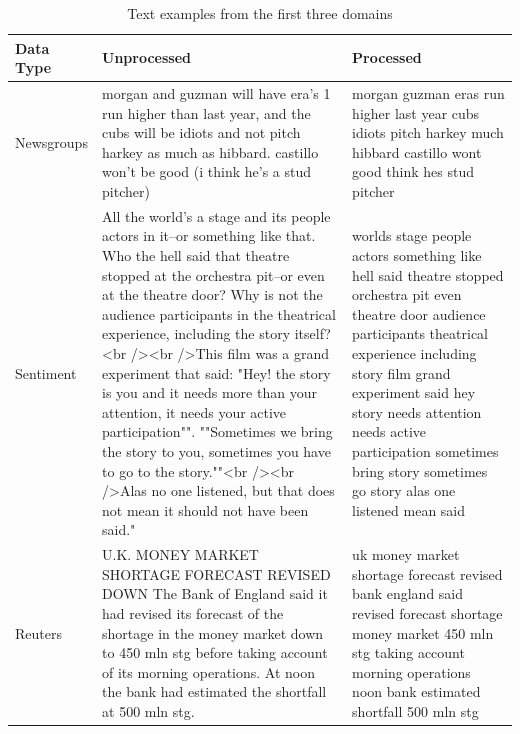 \begin{table}[] 
	\scriptsize
	\begin{tabular}{lp{6.75cm}p{6.75cm}}
		Data Type  & Unprocessed                                                                                                                                                                                                                                                                                                                                                                               & Processed       \\
		\midrule[\heavyrulewidth]
		Newsgroups & morgan and guzman will have era's 1 run higher than last year, and  the cubs will be idiots and not pitch harkey as much as hibbard.  castillo won't be good (i think he's a stud pitcher)                                                                                                                                                                                                & morgan guzman eras run higher last year cubs idiots pitch harkey much hibbard castillo wont good think hes stud pitcher                            \\
		Sentiment  & All the world's a stage and its people actors in it--or something like that. Who the hell said that theatre stopped at the orchestra pit--or even at the theatre door? 
		Why is not the audience participants in the theatrical experience, including the story itself?<br /><br />This film was a grand experiment that said: "Hey! the story is you and it 
		needs more than your attention, it needs your active participation"". ""Sometimes we bring the story to you, sometimes you have to go to the story.""<br /><br />Alas no one listened, 
		but that does not mean it should not have been said." & worlds stage people actors something like hell said theatre stopped orchestra pit even theatre door audience participants
		theatrical experience including  story film grand experiment said hey story needs attention needs active participation sometimes bring story sometimes go story alas one listened mean
		said \\
		Reuters    & U.K. MONEY MARKET SHORTAGE FORECAST REVISED DOWN The Bank of England said it had revised its forecast of the shortage in the money market down to 450 mln stg before taking account of its morning operations. At noon the bank had estimated the shortfall at 500 mln stg.                                                                                                               & uk money market shortage forecast revised bank england said revised forecast shortage money market 450 mln stg taking account morning operations noon bank estimated shortfall 500 mln stg     \\
		
	\end{tabular}
	\caption{Text examples from the first three domains}\label{ch3:TextExamples}
\end{table}

